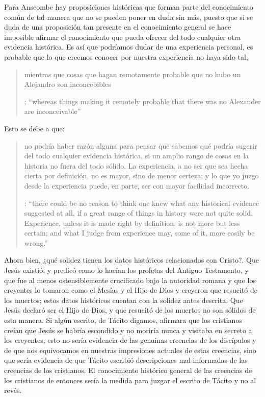 Para Anscombe hay proposiciones históricas que forman parte del conocimiento común de tal manera que no se pueden poner en duda sin más, puesto que si se duda de una proposición tan presente en el conocimiento general se hace imposible afirmar el conocimiento que pueda ofrecer del todo cualquier otra evidencia histórica. Es así que podríamos dudar de una experiencia personal, es probable que lo que creemos conocer por nuestra experiencia no haya sido tal, \blockquote[{\cite[27]{anscombe2008faith:prophandmi}}: \enquote{whereas things making it remotely probable that there was no Alexander are inconceivable}]{mientras que cosas que hagan remotamente probable que no hubo un Alejandro son inconcebibles}. Esto se debe a que: \blockquote[{\cite[27]{anscombe2008faith:prophandmi}}: \enquote{there could be no reason to think one knew what any historical evidence suggested at all, if a great range of things in history were not quite solid. Experience, unless it is made right by definition, is not more but less certain; and what I judge from experience may, some of it, more easily be wrong.}]{no podría haber razón alguna para pensar que sabemos qué podría sugerir del todo cualquier evidencia histórica, si un amplio rango de cosas en la historia no fuera del todo sólido. La experiencia, a no ser que sea hecha cierta por definición, no es mayor, sino de menor certeza; y lo que yo juzgo desde la experiencia puede, en parte, ser con mayor facilidad incorrecto.}

Ahora bien, ¿qué solidez tienen los datos históricos relacionados con Cristo?. Que Jesús existió, y predicó como lo hacían los profetas del Antiguo Testamento, y que fue al menos ostensiblemente crucificado bajo la autoridad romana y que los creyentes lo tomaron como el Mesías y el Hijo de Dios y creyeron que resucitó de los muertos; estos datos históricos cuentan con la solidez antes descrita. Que Jesús declaró ser el Hijo de Dios, y que resucitó de los muertos no son sólidos de esta manera. Si algún escrito, de Tácito digamos, afirmara que los cristianos creían que Jesús se habría escondido y no moriría nunca y visitaba en secreto a los creyentes; esto no sería evidencia de las genuinas creencias de los discípulos y de que nos equivocamos en nuestras impresiones actuales de estas creencias, sino que sería evidencia de que Tácito escribió descripciones mal informadas de las creencias de los cristianos. El conocimiento histórico general de las creencias de los cristianos de entonces sería la medida para juzgar el escrito de Tácito y no al revés.

